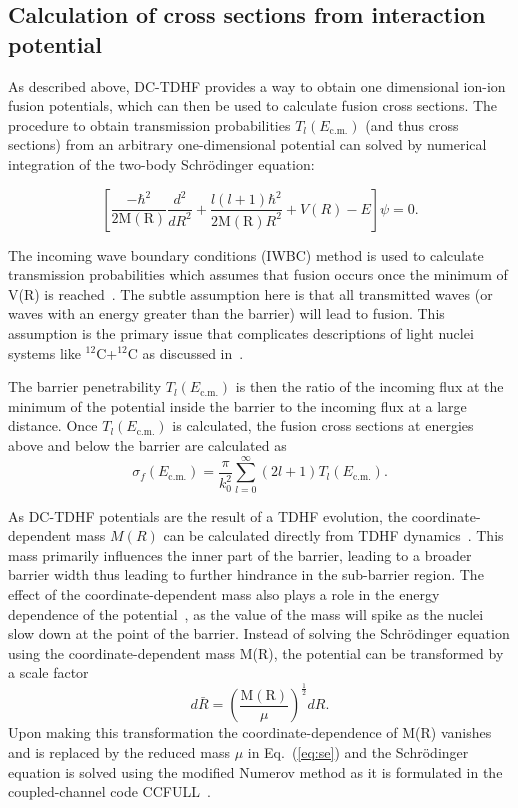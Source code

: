 \documentclass[aps,prc,twocolumn,showpacs,superscriptaddress,longbibliography,floatfix,10pt]{revtex4-1}
\begin{document}
\subsection{Calculation of cross sections from interaction potential}\label{sec:cs}

As described above, DC-TDHF provides a way to obtain one dimensional ion-ion fusion potentials, which can then be used to calculate fusion cross sections.
The procedure to obtain transmission probabilities $T_{l}(E_{\mathrm{c.m.}})$ (and thus cross sections) from an arbitrary one-dimensional potential can solved by numerical integration of the two-body Schr\"odinger equation:

\begin{equation}
\left[\frac{-\hbar^2}{2\mathrm{M(R)}}\frac{d^2}{dR^2}+\frac{l(l+1)\hbar^2}{2\mathrm{M(R)}R^2} + V(R) - E\right]\psi=0 .
\label{eq:se}
\end{equation}

The incoming wave boundary conditions (IWBC) method is used to calculate transmission probabilities which assumes that fusion occurs once the minimum of V(R) is reached~\cite{rawitscher1964}.
The subtle assumption here is that all transmitted waves (or waves with an energy greater than the barrier) will lead to fusion.
This assumption is the primary issue that complicates descriptions of light nuclei systems like $^{12}$C+$^{12}$C as discussed in~\cite{jiang2013,godbey2019b}.

The barrier penetrability $T_l(E_{\mathrm{c.m.}})$ is then the ratio of the incoming flux at the minimum of the potential inside the barrier to the incoming flux at a large distance.
Once $T_l(E_{\mathrm{c.m.}})$ is calculated, the fusion cross sections at energies above and below the barrier are calculated as
\begin{equation}
\sigma_f(E_{\mathrm{c.m.}})=\frac{\pi}{k_0^2}\sum_{l=0}^{\infty}(2l+1)T_l(E_{\mathrm{c.m.}}).
\end{equation}

As DC-TDHF potentials are the result of a TDHF evolution, the coordinate-dependent mass $M(R)$ can
be calculated directly from TDHF dynamics~\cite{umar2009a,umar2009b}.
This mass primarily influences the inner part of the barrier, leading to a broader
barrier width thus leading to further hindrance in the sub-barrier region.
The effect of the coordinate-dependent mass also plays a role in the energy dependence of the potential~\cite{umar2014a}, as the value of the mass will spike as the nuclei slow down at the point of the barrier.
Instead of solving the Schr\"odinger equation using the coordinate-dependent mass M(R), the potential can be transformed by a scale factor~\cite{umar2009b,goeke1983}
\begin{equation}
d\bar{R}=\left(\frac{\mathrm{M(R)}}{\mu}\right)^{\frac{1}{2}}dR.
\end{equation}
Upon making this transformation the coordinate-dependence of M(R) vanishes and is replaced by the reduced mass $\mu$ in Eq.~(\ref{eq:se}) and the Schr\"odinger equation is solved using the modified Numerov method as it is formulated in the coupled-channel code CCFULL~\cite{hagino1999}.
\end{document}
